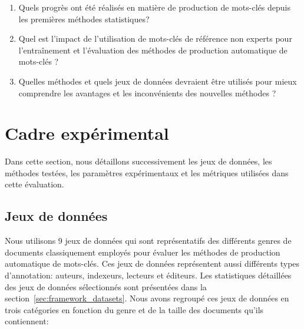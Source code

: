 \begin{enumerate}
    \item Quels progrès ont été réalisés en matière de production de mots-clés depuis les premières méthodes statistiques?
    \item Quel est l'impact de l'utilisation de mots-clés de référence non experts pour l'entraînement et l'évaluation des méthodes de production automatique de mots-clés ?
    \item Quelles méthodes et quels jeux de données devraient être utilisés pour mieux comprendre les avantages et les inconvénients des nouvelles méthodes ?
\end{enumerate}


\section{Cadre expérimental}

%
Dans cette section, nous détaillons successivement les jeux de données, les méthodes testées, les paramètres expérimentaux et les métriques utilisées dans cette évaluation.


\subsection{Jeux de données}
\label{sec:benchmark_datasets}

Nous utilisons 9 jeux de données qui sont représentatifs des différents genres de documents classiquement employés pour évaluer les méthodes de production automatique de mots-clés.
Ces jeux de données représentent aussi différents types d'annotation: auteurs, indexeurs, lecteurs et éditeurs.
Les statistiques détaillées des jeux de données sélectionnés sont présentées dans la section~\ref{sec:framework_datasets}.
Nous avons regroupé ces jeux de données en trois catégories en fonction du genre et de la taille des documents qu'ils contiennent:

